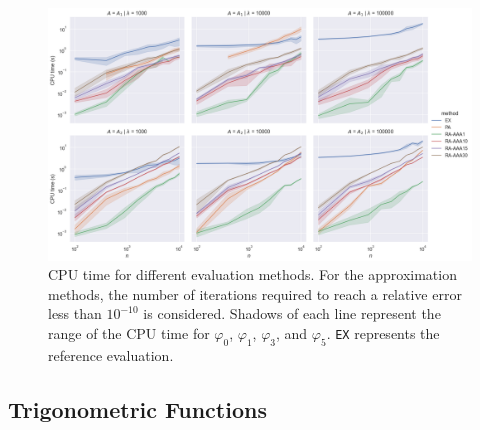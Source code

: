 \begin{figure}[H]
    \centering
    \includegraphics[width=.9\textwidth]{img/krylovapproximation/cputime_methods.png}
    \caption{
        CPU time for different evaluation methods. For the approximation methods,
        the number of iterations required to reach a relative error less than $10^{-10}$
        is considered. Shadows of each line represent the range of the CPU time for
        $\varphi_0$, $\varphi_1$, $\varphi_3$, and $\varphi_5$.
        \texttt{EX} represents the reference evaluation.
    }
    \label{fig:krylovapproximationcputime}
\end{figure}

\FloatBarrier

\subsection{Trigonometric Functions}
\label{sec:resultstrigonometricfunctions}

